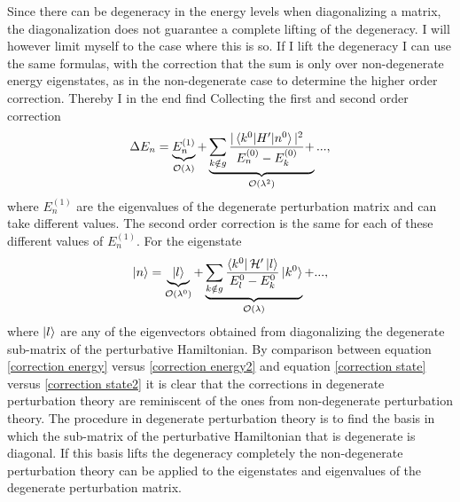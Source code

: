 Since there can be degeneracy in the energy levels when diagonalizing a matrix, the diagonalization does not guarantee a complete lifting of the degeneracy. I will however limit myself to the case where this is so. If I lift the degeneracy I can use the same formulas, with the correction that the sum is only over non-degenerate energy eigenstates, as in the non-degenerate case to determine the higher order correction. Thereby I in the end find
Collecting the first and second order correction
\begin{equation}
	\Delta E_n=\underbrace{E_n^{(1)}}_{\mathcal{O}(\lambda)}+\underbrace{\sum_{k\notin g}\frac{|\braket{k^0|H'|n^0}|^2}{E_n^{(0)}-E_k^{(0)}}+}_{\mathcal{O}(\lambda^2)}..., 
	\label{correction energy2}
\end{equation} 
where $E_n^{(1)}$ are the eigenvalues of the degenerate perturbation matrix and can take different values. The second order correction is the same for each of these different values of $E_n^{(1)}$. For the eigenstate
\begin{equation}
	\ket{n}=\underbrace{\ket{l}}_{\mathcal{O}(\lambda^0)}+\underbrace{\sum_{k \notin g}\frac{\bra{k^0}\mathcal{H}'\ket{l}}{E_l^{0}-E_k^{0}}\ket{k^{0}}}_{\mathcal{O(\lambda)}}+...,
	\label{correction state2}
\end{equation} 
where $\ket{l}$ are any of the eigenvectors obtained from diagonalizing the degenerate sub-matrix of the perturbative Hamiltonian. By comparison between equation \eqref{correction energy} versus \eqref{correction energy2} and equation \eqref{correction state} versus \eqref{correction state2} it is clear that the corrections in degenerate perturbation theory are reminiscent of the ones from non-degenerate perturbation theory. The procedure in degenerate perturbation theory is to find the basis in which the sub-matrix of the perturbative Hamiltonian that is degenerate is diagonal. If this basis lifts the degeneracy completely the non-degenerate perturbation theory can be applied to the eigenstates and eigenvalues of the degenerate perturbation matrix.  

